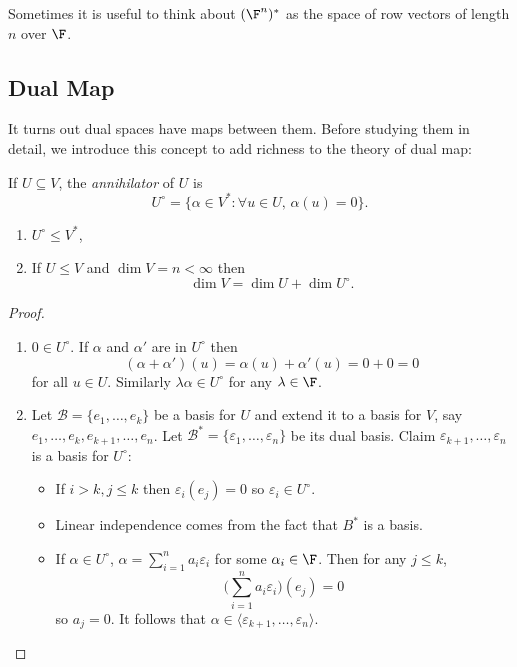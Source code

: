 \documentclass[a4paper]{article}
\newcommand*{\ann}{\circ}
\newcommand*{\basis}{\mathcal}
\theoremstyle{definition}
\begin{document}
\begin{remark}
  Sometimes it is useful to think about \((\F^n)^*\) as the space of row vectors of length \(n\) over \(\F\).
\end{remark}

\subsection{Dual Map}

It turns out dual spaces have maps between them. Before studying them in detail, we introduce this concept to add richness to the theory of dual map:

\begin{definition}[Annihilator]
  If \(U \subseteq V\), the \emph{annihilator} of \(U\) is
  \[
    U^\ann = \{\alpha\in V^*: \forall u \in U,\,\alpha(u) = 0 \}.
  \]
\end{definition}

\begin{lemma}\leavevmode
  \begin{enumerate}
  \item \(U^\ann \leq V^*\),
  \item If \(U \leq V\) and \(\dim V = n < \infty\) then
    \[
      \dim V = \dim U + \dim U^\ann.
    \]
  \end{enumerate}
\end{lemma}

\begin{proof}\leavevmode
  \begin{enumerate}
  \item \(0 \in U^\ann\). If \(\alpha\) and \(\alpha'\) are in \(U^\ann\) then
    \[
      (\alpha+ \alpha')(u) = \alpha(u) + \alpha'(u) = 0+0 = 0
    \]
    for all \(u\in U\). Similarly \(\lambda\alpha\in U^\ann\) for any \(\lambda \in \F\).
  \item Let \(\basis B = \{e_1,\dots, e_k\}\) be a basis for \(U\) and extend it to a basis for \(V\), say \(e_1,\dots,e_k,e_{k+1},\dots,e_n\). Let \(\basis B^*=\{\varepsilon_1,\dots,\varepsilon_n\}\) be its dual basis. Claim \(\varepsilon_{k+1},\dots,\varepsilon_n \) is a basis for \(U^\ann\):
    \begin{itemize}
    \item If \(i>k,j\leq k\) then \(\varepsilon_i(e_j) = 0 \) so \(\varepsilon_i\in U^\ann\).
    \item Linear independence comes from the fact that \(B^*\) is a basis.
    \item If \(\alpha\in U^\ann\), \(\alpha = \sum_{i=1}^na_i\varepsilon_i\) for some \(\alpha_i\in \F\). Then for any \(j\leq k\),
      \[
        \Big( \sum_{i=1}^{n}a_i\varepsilon_i \Big) (e_j) = 0
      \]
      so \(a_j=0\). It follows that \(\alpha \in \langle \varepsilon_{k+1},\dots,\varepsilon_n \rangle\).
    \end{itemize}
  \end{enumerate}
\end{proof}
\end{document}
